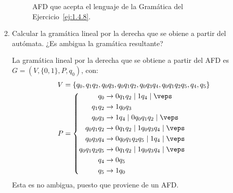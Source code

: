 \begin{ejercicio}
\begin{enumerate}
\begin{figure}
{}
            \caption{AFD que acepta el lenguaje de la Gramática del Ejercicio~\ref{ej:1.4.8}.}
            \label{fig:1.4.8.AFD}
        \end{figure}


        \item Calcular la gramática lineal por la derecha que se obiene a partir del autómata. ¿Es ambigua la gramática resultante?
        
        La gramática lineal por la derecha que se obtiene a partir del AFD es $G=(V,\{0,1\},P,q_0)$, con:
        \begin{equation*}
            \begin{aligned}
                V &= \{ q_0, q_1q_2, q_0q_3, q_0q_1q_2, q_0q_3q_4, q_0q_1q_2q_5, q_4, q_5 \} \\
                P &= \left\{
                    \begin{aligned}
                        q_0 & \rightarrow 0q_1q_2 \mid 1q_4 \mid \veps \\
                        q_1q_2 & \rightarrow 1q_0q_3 \\
                        q_0q_3 & \rightarrow 1q_4 \mid 0q_0q_1q_2 \mid \veps \\
                        q_0q_1q_2 & \rightarrow 0q_1q_2 \mid 1q_0q_3q_4 \mid \veps \\
                        q_0q_3q_4 & \rightarrow 0q_0q_1q_2q_5 \mid 1q_4 \mid \veps \\
                        q_0q_1q_2q_5 & \rightarrow 0q_1q_2 \mid 1q_0q_3q_4 \mid \veps \\
                        q_4 & \rightarrow 0q_5 \\
                        q_5 & \rightarrow 1q_0
                    \end{aligned}
                \right.
            \end{aligned}
        \end{equation*}
        Esta es no ambigua, puesto que proviene de un AFD.
    \end{enumerate}
\end{ejercicio}

